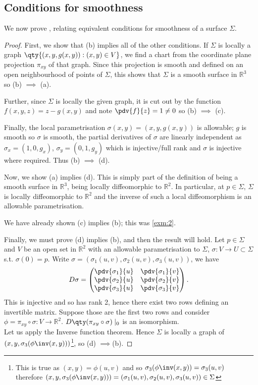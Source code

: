 \subsection{Conditions for smoothness}
We now prove , relating equivalent conditions for smoothness of a surface $\Sigma$.
\begin{proof}
	First, we show that (b) implies all of the other conditions.
	If $\Sigma$ is locally a graph $\qty{(x,y,g(x,y)) : (x, y) \in V}$, we find a chart from the coordinate plane projection $\pi_{xy}$ of that graph.
	Since this projection is smooth and defined on an open neighbourhood of points of $\Sigma$, this shows that $\Sigma$ is a smooth surface in $\mathbb R^3$ so (b) $\implies$ (a).

	Further, since $\Sigma$ is locally the given graph, it is cut out by the function $f(x,y,z) = z - g(x,y)$ and note $\pdv{f}{z} = 1 \neq 0$ so (b) $\implies$ (c).

	Finally, the local parametrisation $\sigma(x,y) = (x,y,g(x,y))$ is allowable; $g$ is smooth so $\sigma$ is smooth, the partial derivatives of $\sigma$ are linearly independent as $\sigma_x = (1, 0, g_x)$, $\sigma_y = (0, 1, g_y)$ which is injective/full rank and $\sigma$ is injective where required.
	Thus (b) $\implies$ (d).

	Now, we show (a) implies (d).
	This is simply part of the definition of being a smooth surface in $\mathbb R^3$, being locally diffeomorphic to $\mathbb R^2$.
	In particular, at $p \in \Sigma$, $\Sigma$ is locally diffeomorphic to $\mathbb R^2$ and the inverse of such a local diffeomorphism is an allowable parametrisation.

	We have already shown (c) implies (b); this was \cref{exm:2}.

	Finally, we must prove (d) implies (b), and then the result will hold.
	Let $p \in \Sigma$ and $V$ be an open set in $\mathbb R^2$ with an allowable parametrisation to $\Sigma$, $\sigma : V \to U \subset \Sigma$ s.t. $\sigma(0) = p$.
	Write $\sigma = (\sigma_1(u,v), \sigma_2(u,v), \sigma_3(u,v))$, we have
	\begin{align*}
		D\sigma = \begin{pmatrix}
			\pdv{\sigma_1}{u} & \pdv{\sigma_1}{v} \\
			\pdv{\sigma_2}{u} & \pdv{\sigma_2}{v} \\
			\pdv{\sigma_3}{u} & \pdv{\sigma_3}{v}
		\end{pmatrix}.
	\end{align*}
	This is injective and so has rank 2, hence there exist two rows defining an invertible matrix.
	Suppose those are the first two rows and consider $\phi = \pi_{xy} \circ \sigma \colon V \to \mathbb R^2$.
	$D\qty(\pi_{xy} \circ \sigma)\mid_0$ is an isomorphism. \\
	Let us apply the Inverse function theorem.
	Hence $\Sigma$ is locally a graph of $(x, y, \sigma_3(\phi\inv(x, y)))$\footnote{This is true as $(x, y) = \phi(u, v)$ and so $\sigma_3(\phi\inv(x, y)) = \sigma_3(u, v)$ therefore $(x, y, \sigma_3(\phi\inv(x, y))) = (\sigma_1(u,v), \sigma_2(u,v), \sigma_3(u,v)) \in \Sigma$}, so (d) $\implies$(b).
\end{proof}

